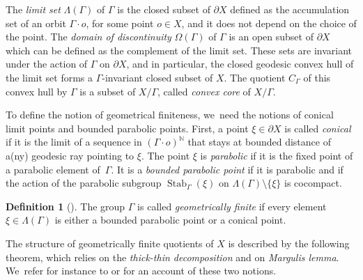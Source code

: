 \documentclass[11pt]{article}
\theoremstyle{definition}
\newtheorem*{definition}{Definition}
\newcommand{\N}{\mathbb{N}}
\begin{document}
The \textit{limit set} $\Lambda(\Gamma)$ of $\Gamma$ is the closed subset of $\partial X$ defined as the accumulation set of an orbit $\Gamma \cdot o$, for some point $o\in X$, and it does not depend on the choice of the point. The \textit{domain of discontinuity} $\Omega(\Gamma)$ of $\Gamma$ is an open subset of $\partial X$ which can be defined as the complement of the limit set. These sets are invariant under the action of $\Gamma$ on $\partial X$, and in particular, the closed geodesic convex hull of the limit set forms a $\Gamma$\nobreakdash-invariant closed subset of $X$. The quotient $C_{\Gamma}$ of this convex hull by $\Gamma$ is a subset of $X/\Gamma$, called \textit{convex core} of $X/\Gamma$.

To define the notion of geometrical finiteness, we~need the notions of conical limit points and bounded parabolic points. First, a point $\xi\in \partial X$ is called \textit{conical} if it is the limit of a sequence in $(\Gamma \cdot o)^{\N}$ that stays at bounded distance of a(ny) geodesic ray pointing to $\xi$. The point $\xi$ is \textit{parabolic} if it is the fixed point of a parabolic element of~$\Gamma$. It is a \textit{bounded parabolic point} if it is parabolic and if the action of the parabolic subgroup $\operatorname{Stab}_{\Gamma}(\xi)$ on $\Lambda(\Gamma)\setminus\{\xi\}$ is cocompact.

\begin{definition}[{\cite[Def.\,F2]{bowditchGeometricalFinitenessVariable1995}}]
The group $\Gamma$ is called \textit{geometrically finite} if every element $\xi\in\Lambda(\Gamma)$ is either a bounded parabolic point or a conical point.
\end{definition}

The structure of geometrically finite quotients of $X$ is described by the following theorem, which relies on the \textit{thick-thin decomposition} and on \textit{Margulis lemma}. We~refer for instance to \cite[Ch.\,D]{benedettiLecturesHyperbolicGeometry1992} or \cite[\S 3.5]{bowditchGeometricalFinitenessVariable1995} for an account of these two notions.
\end{document}
